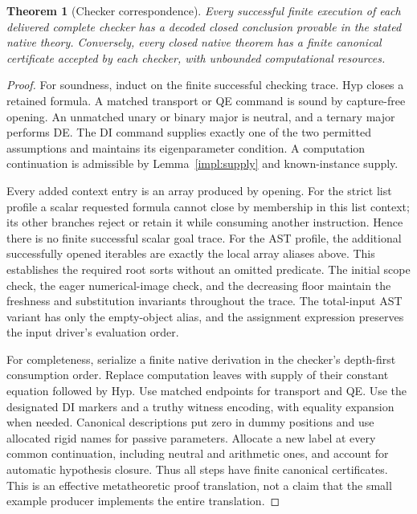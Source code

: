 \documentclass[11pt,letterpaper]{article}
\newtheorem{theorem}{Theorem}[section]
\theoremstyle{definition}\newtheorem{definition}[theorem]{Definition}
\theoremstyle{remark}\newtheorem{remark}[theorem]{Remark}
\begin{document}
\begin{theorem}[Checker correspondence]\label{impl:correspondence}
Every successful finite execution of each delivered complete checker has a
decoded closed conclusion provable in the stated native theory.
Conversely, every closed native theorem has a finite canonical certificate
accepted by each checker, with unbounded computational resources.
\end{theorem}
\begin{proof}
For soundness, induct on the finite successful checking trace. Hyp closes
a retained formula. A matched transport or QE command is sound by
capture-free opening. An unmatched unary or binary major is neutral,
and a ternary major performs DE. The DI command supplies exactly one of
the two permitted assumptions and maintains its eigenparameter condition.
A computation continuation is admissible by Lemma~\ref{impl:supply} and
known-instance supply.

Every added context entry is an array produced by opening. For the
strict list profile a scalar requested formula cannot close by membership
in this list context; its other branches reject or retain it while
consuming another instruction. Hence there is no finite successful scalar
goal trace. For the AST profile, the additional successfully opened
iterables are exactly the local array aliases above. This establishes the
required root sorts without an omitted predicate. The initial scope check,
the eager numerical-image check, and the decreasing floor maintain the
freshness and substitution invariants throughout the trace.
The total-input AST variant has only the empty-object alias, and the
assignment expression preserves the input driver's evaluation order.

For completeness, serialize a finite native derivation in the checker's
depth-first consumption order. Replace computation leaves with supply of
their constant equation followed by Hyp. Use matched endpoints for
transport and QE. Use the designated DI markers and a truthy witness
encoding, with equality expansion when needed. Canonical descriptions put
zero in dummy positions and use allocated rigid names for passive
parameters. Allocate a new label at every common continuation, including
neutral and arithmetic ones, and account for automatic hypothesis closure.
Thus all steps have finite canonical certificates. This is an effective
metatheoretic proof translation, not a claim that the small example
producer implements the entire translation.
\end{proof}
\end{document}
